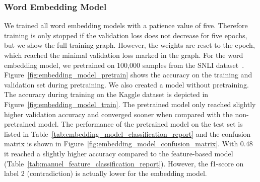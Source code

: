 \documentclass[acmsmall,nonacm]{acmart}
\begin{document}
\subsubsection{Word Embedding Model}
We trained all word embedding models with a patience value of five. Therefore training is only stopped if the validation loss does not decrease for five epochs, but we show the full training graph. However, the weights are reset to the epoch, which reached the minimal validation loss marked in the graph.
For the word embedding model, we pretrained on 100,000 samples from the SNLI dataset~\cite{snli-bowman2015}. Figure~\ref{fig:embedding_model_pretrain} shows the accuracy on the training and validation set during pretraining. We also created a model without pretraining. The accuracy during training on the Kaggle dataset is depicted in Figure~\ref{fig:embedding_model_train}. The pretrained model only reached slightly higher validation accuracy and converged sooner when compared with the non-pretrained model. The performance of the pretrained model on the test set is listed in Table~\ref{tab:embedding_model_classification_report} and the confusion matrix is shown in Figure~\ref{fig:embedding_model_confusion_matrix}. With 0.48 it reached a slightly higher accuracy compared to the feature-based model (Table~\ref{tab:manuel_feature_classification_report}). However, the f1-score on label 2 (contradiction) is actually lower for the embedding model. 
\end{document}
